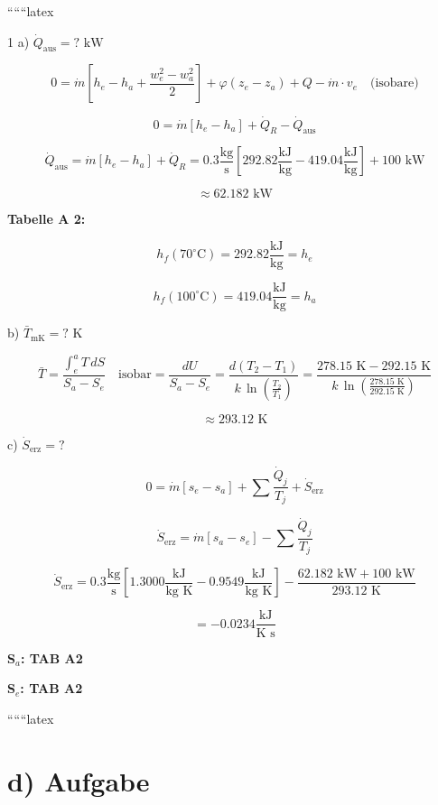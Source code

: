 
``````latex


1 a) $\dot{Q}_{\text{aus}} = ? \text{ kW}$

\[
0 = \dot{m} \left[ h_e - h_a + \frac{w_e^2 - w_a^2}{2} \right] + \varphi (z_e - z_a) + Q - \dot{m} \cdot v_e \quad \text{(isobare)}
\]

\[
0 = \dot{m} \left[ h_e - h_a \right] + \dot{Q}_R - \dot{Q}_{\text{aus}}
\]

\[
\dot{Q}_{\text{aus}} = \dot{m} \left[ h_e - h_a \right] + \dot{Q}_R = 0.3 \frac{\text{kg}}{\text{s}} \left[ 292.82 \frac{\text{kJ}}{\text{kg}} - 419.04 \frac{\text{kJ}}{\text{kg}} \right] + 100 \text{ kW}
\]

\[
\approx 62.182 \text{ kW}
\]

\textbf{Tabelle A 2:}

\[
h_f (70^\circ \text{C}) = 292.82 \frac{\text{kJ}}{\text{kg}} = h_e
\]

\[
h_f (100^\circ \text{C}) = 419.04 \frac{\text{kJ}}{\text{kg}} = h_a
\]

b) $\bar{T}_{\text{mK}} = ? \text{ K}$

\[
\bar{T} = \frac{\int_{e}^{a} T \, dS}{S_a - S_e} \quad \text{isobar} = \frac{dU}{S_a - S_e} = \frac{d(T_2 - T_1)}{k \, \ln \left( \frac{T_2}{T_1} \right)} = \frac{278.15 \text{ K} - 292.15 \text{ K}}{k \, \ln \left( \frac{278.15 \text{ K}}{292.15 \text{ K}} \right)}
\]

\[
\approx 293.12 \text{ K}
\]

c) $\dot{S}_{\text{erz}} = ?$

\[
0 = \dot{m} \left[ s_e - s_a \right] + \sum \frac{\dot{Q}_j}{T_j} + \dot{S}_{\text{erz}}
\]

\[
\dot{S}_{\text{erz}} = \dot{m} \left[ s_a - s_e \right] - \sum \frac{\dot{Q}_j}{T_j}
\]

\[
\dot{S}_{\text{erz}} = 0.3 \frac{\text{kg}}{\text{s}} \left[ 1.3000 \frac{\text{kJ}}{\text{kg K}} - 0.9549 \frac{\text{kJ}}{\text{kg K}} \right] - \frac{62.182 \text{ kW} + 100 \text{ kW}}{293.12 \text{ K}}
\]

\[
= -0.0234 \frac{\text{kJ}}{\text{K s}}
\]

\textbf{S$_a$: TAB A2}

\textbf{S$_e$: TAB A2}

``````latex

\section*{d) Aufgabe}

